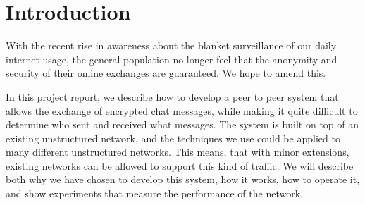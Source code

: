 \section{Introduction}
With the recent rise in awareness about the blanket surveillance of our daily internet usage, the general population no longer feel that the anonymity and security of their online exchanges are guaranteed. We hope to amend this. 

In this project report, we describe how to develop a peer to peer system that allows the exchange of  encrypted chat messages, while making it quite difficult to determine who sent and received what messages.
The system is built on top of an existing unstructured network, and the techniques we use could be applied to many different unstructured networks. This means, that with minor extensions, existing networks can be allowed to support this kind of traffic.
We will describe both why we have chosen to develop this system, how it works, how to operate it, and show experiments that measure the performance of the network.